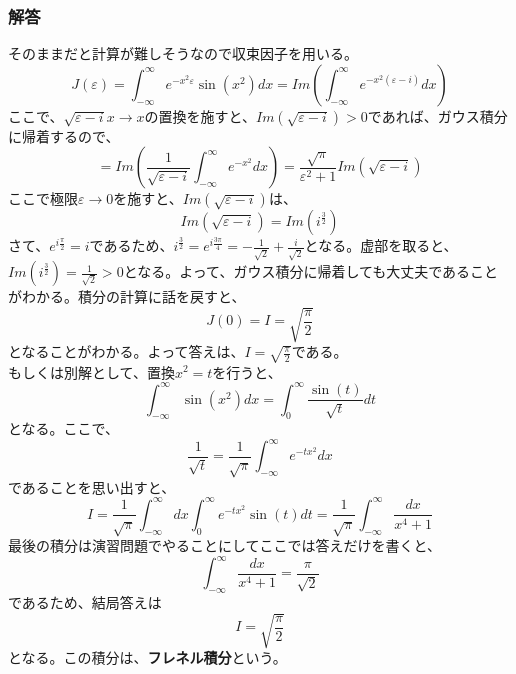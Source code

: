 \documentclass[a4j,dvipdfmx]{jsarticle}
\begin{document}
\subsubsection*{解答}
そのままだと計算が難しそうなので収束因子を用いる。
\begin{equation*}
    J(\varepsilon)=\int_{-\infty}^{\infty}e^{-x^2\varepsilon}\sin(x^2)dx=Im\left(\int_{-\infty}^{\infty}e^{-x^2(\varepsilon-i)}dx\right)
\end{equation*}
ここで、$\sqrt{\varepsilon-i}x\to x$の置換を施すと、$Im(\sqrt{\varepsilon-i})>0$であれば、ガウス積分に帰着するので、
\begin{equation*}
    =Im\left(\frac{1}{\sqrt{\varepsilon-i}}\int_{-\infty}^{\infty}e^{-x^2}dx\right)=\frac{\sqrt{\pi}}{\varepsilon^2+1}Im\left(\sqrt{\varepsilon-i}\right)
\end{equation*}
ここで極限$\varepsilon\to 0$を施すと、$Im(\sqrt{\varepsilon-i})$は、
\begin{equation*}
    Im(\sqrt{\varepsilon-i})=Im(i^{\frac{3}{2}})
\end{equation*}
さて、$\displaystyle e^{i\frac{\pi}{2}}=i$であるため、$i^{\frac{3}{2}}=e^{i\frac{3\pi}{4}}=-\frac{1}{\sqrt{2}}+\frac{i}{\sqrt{2}}$となる。虚部を取ると、
$Im(i^{\frac{3}{2}})=\frac{1}{\sqrt{2}}>0$となる。よって、ガウス積分に帰着しても大丈夫であることがわかる。積分の計算に話を戻すと、
\begin{equation*}
    J(0)=I=\sqrt{\frac{\pi}{2}}
\end{equation*}
となることがわかる。よって答えは、$\displaystyle I=\sqrt{\frac{\pi}{2}}$である。\\

もしくは別解として、置換$x^2=t$を行うと、
\begin{equation*}
    \int_{-\infty}^\infty \sin(x^2)dx=\int_{0}^{\infty}\frac{\sin(t)}{\sqrt{t}}dt
\end{equation*}
となる。ここで、
\begin{equation*}
    \frac{1}{\sqrt{t}}=\frac{1}{\sqrt{\pi}}\int_{-\infty}^{\infty}e^{-tx^2}dx
\end{equation*}
であることを思い出すと、
\begin{equation*}
    I=\frac{1}{\sqrt{\pi}}\int_{-\infty}^{\infty}dx\int_{0}^{\infty}e^{-tx^2}\sin(t)dt=\frac{1}{\sqrt{\pi}}\int_{-\infty}^{\infty}\frac{dx}{x^4+1}
\end{equation*}
最後の積分は演習問題でやることにしてここでは答えだけを書くと、
\begin{equation*}
    \int_{-\infty}^{\infty}\frac{dx}{x^4+1}=\frac{\pi}{\sqrt{2}}
\end{equation*}
であるため、結局答えは
\begin{equation*}
    I=\sqrt{\frac{\pi}{2}}
\end{equation*}
となる。この積分は、\textbf{フレネル積分}という。
\newpage
\end{document}
